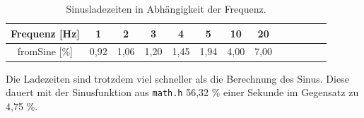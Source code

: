 \begin{table}[h]
    \centering
    \caption{Sinusladezeiten in Abhängigkeit der Frequenz.}
    \label{tab:fromSineFrequenz}
    
    \begin{tabular}{c|cccccccccccc}
        Frequenz [Hz]
        & 1    & 2    & 3    & 4    & 5    & 10   & 20 \\ 
        \hline
        fromSine [\%]
        & 0,92 & 1,06 & 1,20 & 1,45 & 1,94 & 4,00 & 7,00
    \end{tabular}
\end{table}

Die Ladezeiten sind trotzdem viel schneller als die Berechnung des Sinus. 
Diese dauert mit der Sinusfunktion aus \lstinline|math.h|
56,32 \% einer Sekunde im Gegensatz zu 4,75 \%.

